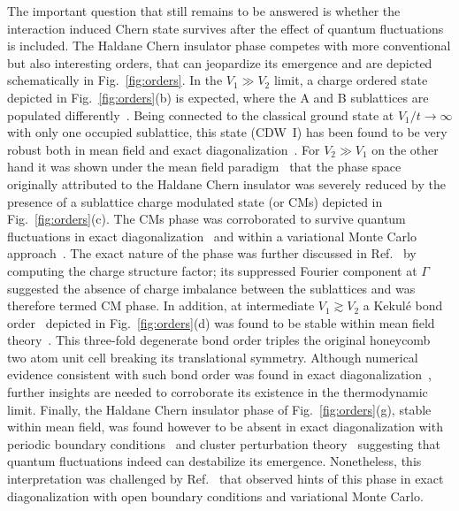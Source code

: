 \documentclass[aps,prx,10pt,twocolumn,floatfix,superscriptaddress,showpacs,numerical,footinbib]{revtex4-1}
\begin{document}
The important question that still remains to be answered is whether the interaction induced Chern state survives 
after the effect of quantum fluctuations is included.
%
The Haldane Chern insulator phase competes with more conventional but also interesting orders, 
that can jeopardize its emergence and are depicted schematically in Fig.~\ref{fig:orders}.
%
In the $V_{1} \gg V_{2}$ limit, a charge ordered state depicted in Fig.~\ref{fig:orders}(b) is expected, 
where the A and B sublattices are populated differently~\cite{RQHZ08,WCT14,LJY14b}.
%
Being connected to the classical ground state at $V_{1}/t \to \infty$ with only one occupied sublattice, this state (CDW~I) has been found to be very robust both in mean field and exact diagonalization~\cite{GGNVC13,DH14}.
%
For $V_{2}\gg V_{1}$ on the other hand it was shown under the mean field paradigm~\cite{GCC13} that the phase space originally attributed to the Haldane Chern insulator 
was severely reduced by the presence of a sublattice charge modulated state (or CMs) depicted in Fig.~\ref{fig:orders}(c).
%
The CMs phase was corroborated to survive quantum fluctuations in exact diagonalization~\cite{GGNVC13,DH14,DCH14} 
and within a variational Monte Carlo approach~\cite{DCH14}.
%
The exact nature of the phase was further discussed in Ref.~\cite{DH14} by computing the charge structure factor; 
its suppressed Fourier component at $\Gamma$ suggested the absence of charge imbalance between the sublattices and 
was therefore termed CM phase.
%
In addition, at intermediate $V_{1}\gtrsim V_{2}$ a Kekul\'e bond order~\cite{C00,HCM07,RH10,RJH13} 
depicted in Fig.~\ref{fig:orders}(d) was found to be stable within mean field theory~\cite{WF10}.
%
This three-fold degenerate bond order triples the original honeycomb two atom unit cell breaking its translational symmetry.
%
Although numerical evidence consistent with such bond order was found in exact diagonalization~\cite{GGNVC13}, further insights are needed to corroborate its existence in the thermodynamic limit.
%
Finally, the Haldane Chern insulator phase of Fig.~\ref{fig:orders}(g), stable within mean field, was found however to be absent in exact diagonalization with periodic boundary conditions~\cite{GGNVC13,DH14} and cluster perturbation theory~\cite{DH14} suggesting that quantum fluctuations indeed can destabilize its emergence.
%
Nonetheless, this interpretation was challenged by Ref.~\cite{DCH14} that observed hints of this phase in exact diagonalization with open boundary conditions and variational Monte Carlo.\\
\end{document}
